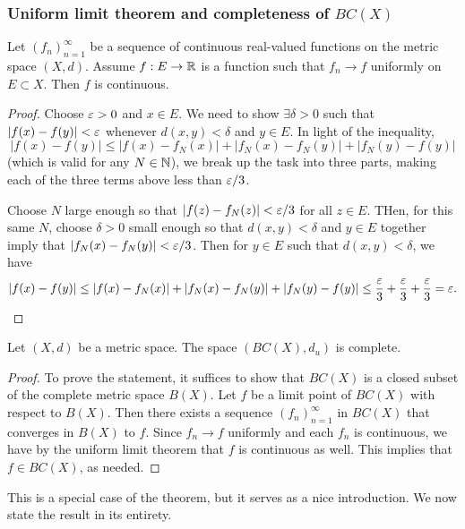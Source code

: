 \documentclass[12pt]{scrartcl} %
\begin{document}
\subsubsection{Uniform limit theorem and completeness of $BC(X)$}\label{subsubsec:uniform-limit-theorem}

\begin{theorem}
    Let $(f_n)_{n=1}^{\infty}$ be a sequence of continuous real-valued functions on the metric space $(X, d)$. Assume $f : E \to \mathbb{R}$ is a function such that $f_n \to f$ uniformly on $E \subset X$. Then $f$ is continuous.
\end{theorem}

\begin{proof}
    Choose $\varepsilon > 0$ and $x \in E$. We need to show $\exists \delta > 0$ such that $|f(x) - f(y)| < \varepsilon$ whenever $d(x, y) < \delta$ and $y \in E$. In light of the inequality, \[|f(x) - f(y)| \leq |f(x) - f_N(x)| + |f_N(x) - f_N(y)| + |f_N(y) - f(y)|\] (which is valid for any $N \in \mathbb{N}$), we break up the task into three parts, making each of the three terms above less than $\varepsilon / 3$.

    Choose $N$ large enough so that $|f(z) - f_N(z)| < \varepsilon / 3$ for all $z \in E$. THen, for this same $N$, choose $\delta > 0$ small enough so that $d(x, y) < \delta$ and $y \in E$ together imply that $|f_N(x) - f_N(y)| < \varepsilon/3$. Then for $y \in E$ such that $d(x, y) < \delta$, we have \[|f(x) - f(y)| \leq |f(x) - f_N(x)| + |f_N(x) - f_N(y)| + |f_N(y) - f(y)| \leq \frac{\varepsilon}{3} + \frac{\varepsilon}{3} + \frac{\varepsilon}{3} = \varepsilon.\]
\end{proof}

\begin{definition}
    Let $(X, d)$ be a metric space. The space $(BC(X), d_u)$ is complete.
\end{definition}

\begin{proof}
    To prove the statement, it suffices to show that $BC(X)$ is a closed subset of the complete metric space $B(X)$. Let $f$ be a limit point of $BC(X)$ with respect to $B(X)$. Then there exists a sequence $(f_n)_{n=1}^{\infty}$ in $BC(X)$ that converges in $B(X)$ to $f$. Since $f_n \to f$ uniformly and each $f_n$ is continuous, we have by the uniform limit theorem that $f$ is continuous as well. This implies that $f \in BC(X)$, as needed.
\end{proof}

This is a special case of the theorem, but it serves as a nice introduction. We now state the result in its entirety.
\end{document}
